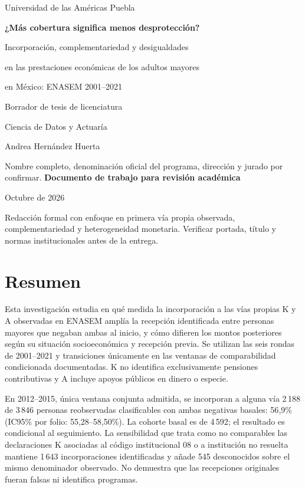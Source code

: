 \documentclass[12pt,letterpaper,oneside]{report}
\begin{document}
\hypersetup{pageanchor=false}
\begin{titlepage}
  \centering
  {\Large Universidad de las Américas Puebla\par}
  \vspace{1.8cm}
  {\LARGE\bfseries ¿Más cobertura significa menos desprotección?\par
  Incorporación, complementariedad y desigualdades\par
  en las prestaciones económicas de los adultos mayores\par
  en México: ENASEM 2001--2021\par}
  \vspace{1.4cm}
  {\large Borrador de tesis de licenciatura\par}
  \medskip
  {\large Ciencia de Datos y Actuaría\par}
  \vspace{1cm}
  {\large Andrea Hernández Huerta\par}
  \medskip
  Nombre completo, denominación oficial del programa, dirección y jurado por confirmar.
  \vfill
  \textbf{Documento de trabajo para revisión académica}\par
  Octubre de 2026\par
  \medskip
  \small Redacción formal con enfoque en primera vía propia observada,
  complementariedad y heterogeneidad monetaria. Verificar portada,
  título y normas institucionales antes de la entrega.
\end{titlepage}

\hypersetup{pageanchor=true}
\chapter*{Resumen}

Esta investigación estudia en qué medida la incorporación a las vías
propias K y A observadas en ENASEM amplía la recepción identificada entre
personas mayores que negaban ambas al inicio, y cómo difieren los montos
posteriores según su situación socioeconómica y recepción previa. Se utilizan
las seis rondas de 2001--2021 y transiciones únicamente en las ventanas de
comparabilidad condicionada documentadas. K no identifica exclusivamente
pensiones contributivas y A incluye apoyos públicos en dinero o especie.

En 2012--2015, única ventana conjunta admitida, se incorporan a alguna vía
2\,188 de 3\,846 personas reobservadas clasificables con ambas negativas
basales: 56{,}9\% (IC95\% por folio: 55{,}28--58{,}50\%). La cohorte basal
es de 4\,592; el resultado es condicional al seguimiento. La sensibilidad que
trata como no comparables las declaraciones K asociadas al código institucional
08 o a institución no resuelta mantiene 1\,643 incorporaciones identificadas
y añade 545 desconocidos sobre el mismo denominador observado. No demuestra
que las recepciones originales fueran falsas ni identifica programas.
\end{document}
